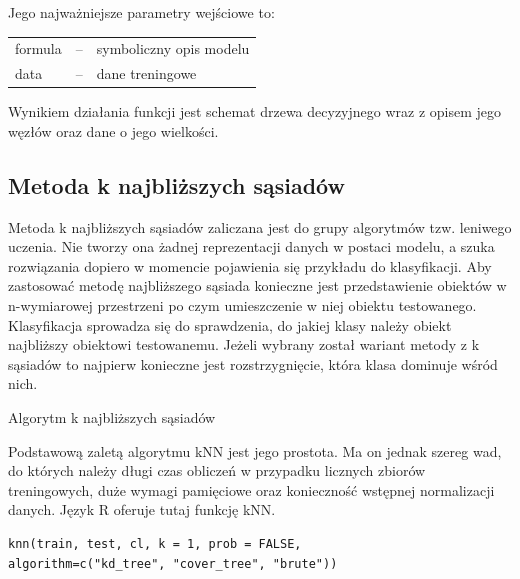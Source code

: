 \documentclass[11pt,a4paper,twoside]{article}
\begin{document}
Jego najważniejsze parametry wejściowe to:

\begin{table}[ht]
\label{j48_params}
\centering
\begin{tabularx}{\textwidth}{lcX}
formula & -- & symboliczny opis modelu \\
data & -- & dane treningowe \\
\end{tabularx}
\end{table}

Wynikiem działania funkcji jest schemat drzewa decyzyjnego wraz z opisem jego węzłów oraz dane o jego wielkości.

\subsection{Metoda k najbliższych sąsiadów}

Metoda k najbliższych sąsiadów zaliczana jest do grupy algorytmów tzw. leniwego uczenia. Nie tworzy ona żadnej reprezentacji danych w postaci modelu, a szuka rozwiązania dopiero w momencie pojawienia się przykładu do klasyfikacji. Aby zastosować metodę najbliższego sąsiada konieczne jest przedstawienie obiektów w n-wymiarowej przestrzeni po czym umieszczenie w niej obiektu testowanego. Klasyfikacja sprowadza się do sprawdzenia, do jakiej klasy należy obiekt najbliższy obiektowi testowanemu. Jeżeli wybrany został wariant metody z k sąsiadów to najpierw konieczne jest rozstrzygnięcie, która klasa dominuje wśród nich.

\begin{algorithm}[ht]
\caption{Algorytm k najbliższych sąsiadów}
\label{kNN}
	\begin{algorithmic}
	\end{algorithmic}
\end{algorithm}

Podstawową zaletą algorytmu kNN jest jego prostota. Ma on jednak szereg wad, do których należy długi czas obliczeń w przypadku licznych zbiorów treningowych, duże wymagi pamięciowe oraz konieczność wstępnej normalizacji danych. Język R oferuje tutaj funkcję kNN.

\begin{verbatim}
knn(train, test, cl, k = 1, prob = FALSE, 
algorithm=c("kd_tree", "cover_tree", "brute"))
\end{verbatim} 
\end{document}
